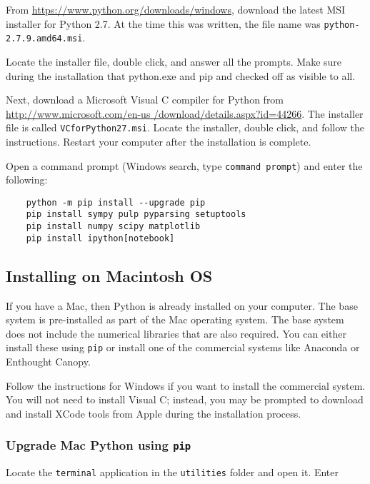 From \href{https://www.python.org/downloads/windows}{https://www.python.org/downloads/windows}, download the latest MSI installer for Python 2.7. At the time this was written, the file name was {\tt python-2.7.9.amd64.msi}. 

Locate the installer file, double click, and answer all the prompts. Make sure during the installation that python.exe and pip and checked off as visible to all. 

Next, download a Microsoft Visual C compiler for Python from \href{http://www.microsoft.com/en-us/download/details.aspx?id=44266}{http://www.microsoft.com/en-us /download/details.aspx?id=44266}. The installer file is called {\tt VCforPython27.msi}. Locate the installer, double click, and follow the instructions. Restart your computer after the installation is complete.

Open a command prompt (Windows search, type {\tt command prompt}) and enter the following:

\begin{verbatim}
    python -m pip install --upgrade pip   
    pip install sympy pulp pyparsing setuptools
    pip install numpy scipy matplotlib
    pip install ipython[notebook]
\end{verbatim}


\subsection{Installing on Macintosh OS}

If you have a Mac, then Python is already installed on your computer. The base system is pre-installed as part of the Mac operating system. The base system does not include the numerical libraries that are also required. You can either install these using {\tt pip} or install one of the commercial systems like Anaconda or Enthought Canopy. 

Follow the instructions for Windows if you want to install the commercial system. You will not need to install Visual C; instead, you may be prompted to download and install XCode tools from Apple during the installation process.  

\subsubsection{Upgrade Mac Python using \tt pip}

Locate the {\tt terminal} application in the {\tt utilities} folder and open it. Enter

